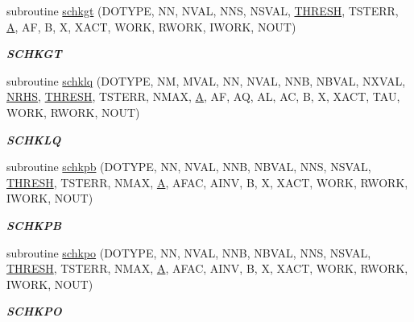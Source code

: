 \begin{DoxyCompactItemize}
subroutine \hyperlink{group__single__lin_ga1f5d91c416987833ae96410f5119609a}{schkgt} (D\+O\+T\+Y\+P\+E, N\+N, N\+V\+A\+L, N\+N\+S, N\+S\+V\+A\+L, \hyperlink{zlaqgs_8c_a0656018abfc9fa2821827415f5d5ea57}{T\+H\+R\+E\+S\+H}, T\+S\+T\+E\+R\+R, \hyperlink{classA}{A}, A\+F, B, X, X\+A\+C\+T, W\+O\+R\+K, R\+W\+O\+R\+K, I\+W\+O\+R\+K, N\+O\+U\+T)
\begin{DoxyCompactList}\small\item\em {\bfseries S\+C\+H\+K\+G\+T} \end{DoxyCompactList}\item 
subroutine \hyperlink{group__single__lin_gaa8c61ad5245bb569b08f463ba28d0e68}{schklq} (D\+O\+T\+Y\+P\+E, N\+M, M\+V\+A\+L, N\+N, N\+V\+A\+L, N\+N\+B, N\+B\+V\+A\+L, N\+X\+V\+A\+L, \hyperlink{example__user_8c_aa0138da002ce2a90360df2f521eb3198}{N\+R\+H\+S}, \hyperlink{zlaqgs_8c_a0656018abfc9fa2821827415f5d5ea57}{T\+H\+R\+E\+S\+H}, T\+S\+T\+E\+R\+R, N\+M\+A\+X, \hyperlink{classA}{A}, A\+F, A\+Q, A\+L, A\+C, B, X, X\+A\+C\+T, T\+A\+U, W\+O\+R\+K, R\+W\+O\+R\+K, N\+O\+U\+T)
\begin{DoxyCompactList}\small\item\em {\bfseries S\+C\+H\+K\+L\+Q} \end{DoxyCompactList}\item 
subroutine \hyperlink{group__single__lin_gaa555415abc8924ec394f0dfc4eadafbb}{schkpb} (D\+O\+T\+Y\+P\+E, N\+N, N\+V\+A\+L, N\+N\+B, N\+B\+V\+A\+L, N\+N\+S, N\+S\+V\+A\+L, \hyperlink{zlaqgs_8c_a0656018abfc9fa2821827415f5d5ea57}{T\+H\+R\+E\+S\+H}, T\+S\+T\+E\+R\+R, N\+M\+A\+X, \hyperlink{classA}{A}, A\+F\+A\+C, A\+I\+N\+V, B, X, X\+A\+C\+T, W\+O\+R\+K, R\+W\+O\+R\+K, I\+W\+O\+R\+K, N\+O\+U\+T)
\begin{DoxyCompactList}\small\item\em {\bfseries S\+C\+H\+K\+P\+B} \end{DoxyCompactList}\item 
subroutine \hyperlink{group__single__lin_ga2167d9820a0c0a23c11903831690ef0f}{schkpo} (D\+O\+T\+Y\+P\+E, N\+N, N\+V\+A\+L, N\+N\+B, N\+B\+V\+A\+L, N\+N\+S, N\+S\+V\+A\+L, \hyperlink{zlaqgs_8c_a0656018abfc9fa2821827415f5d5ea57}{T\+H\+R\+E\+S\+H}, T\+S\+T\+E\+R\+R, N\+M\+A\+X, \hyperlink{classA}{A}, A\+F\+A\+C, A\+I\+N\+V, B, X, X\+A\+C\+T, W\+O\+R\+K, R\+W\+O\+R\+K, I\+W\+O\+R\+K, N\+O\+U\+T)
\begin{DoxyCompactList}\small\item\em {\bfseries S\+C\+H\+K\+P\+O} \end{DoxyCompactList}\item 

\end{DoxyCompactItemize}
